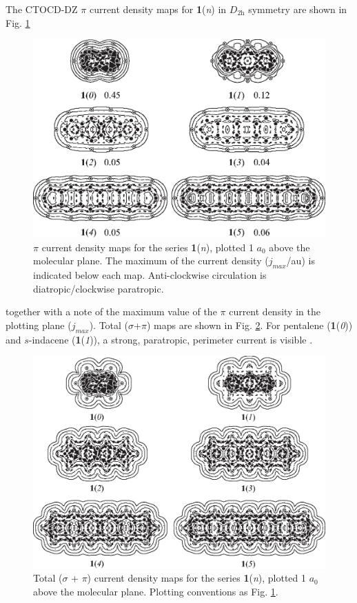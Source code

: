 The CTOCD-DZ $\pi$ current density maps for \textbf{1}(\textit{n}) in $D_\mathrm{2h}$ symmetry are shown in Fig. \ref{ch7.fig01}
\begin{figure}[htp]
\center
\includegraphics{indacene/figures/figure1.eps}
\caption{$\pi$ current density maps for the series \textbf{1}(\textit{n}), plotted 1 $a_0$ above the molecular plane. The maximum of the current density ($j_{max}$/au) is indicated below each map. Anti-clockwise circulation is diatropic/clockwise paratropic.}
\label{ch7.fig01}
\end{figure}
 together with a note of the maximum value of the $\pi$ current density in the plotting plane ($j_{max}$). Total ($\sigma$+$\pi$) maps are shown in Fig. \ref{ch7.fig02}. For pentalene (\textbf{1}(\textit{0})) and $s$-indacene (\textbf{1}(\textit{1})), a strong, paratropic, perimeter current is visible  \cite{r05,r14}.
\begin{figure}[hbp]
\center
\includegraphics[scale=0.8]{indacene/figures/figure2.eps}
\caption{Total ($\sigma$ + $\pi$) current density maps for the series \textbf{1}(\textit{n}), plotted 1 $a_0$ above the molecular plane. Plotting conventions as Fig. \ref{ch7.fig01}.}
\label{ch7.fig02}
\end{figure}

